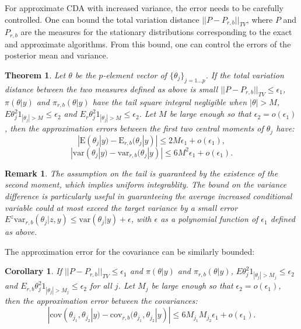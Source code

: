 \documentclass[10pt]{article}
\newtheorem{theorem}{Theorem}
\newtheorem{corollary}{Corollary}
\newtheorem{remark}{Remark}
\begin{document}
For approximate CDA with increased variance, the error needs to be carefully controlled. One can bound the total variation distance $||{P}-{P}_{r,b} ||_{TV}$, where ${P}$ and ${P}_{r,b}$ are the measures for the stationary distributions corresponding to the exact and approximate algorithms. From this bound, one can control the errors of the posterior mean and variance.

\begin{theorem}
Let $\theta$ be the $p$-element vector of $\{\theta_j\}_{j=1\ldots p}$.
If the total variation distance between the two measures defined as above is small $||{P}- {P}_{r,b} ||_{TV}\le \epsilon_1$, $\pi(\theta|y)$ and $\pi_{r,b}(\theta|y)$ have the tail square integral negligible when $|\theta|>M$,  $E \theta_j^2 {1}_{|\theta_j|>M}\le \epsilon_2$ and $E_{r} \theta_j^2 {1}_{|\theta_j|>M}\le \epsilon_2$. Let $M$ be large enough so that $\epsilon_2=o(\epsilon_1)$, then the approximation errors between the first two central moments of $\theta_j$ have:
$$|\mbox{E}(\theta_j|y)-\mbox{E}_{r,b}(\theta_j|y)|\le 2M\epsilon_1+ o(\epsilon_1),$$
$$|\mbox{var}(\theta_j|y)-\mbox{var}_{r,b}(\theta_j|y)|\le 6M^2\epsilon_1+o(\epsilon_1).$$
\end{theorem}
 
 \begin{remark}
 	The assumption on the tail is guaranteed by the existence of the second moment, which implies uniform integrablity. The bound on the variance difference is particularly useful in guaranteeing the average increased conditional variable could at most exceed the target variance by a small error $E^z\mbox{var}_{r,b}(\theta_j|z,y)\le\mbox{var}(\theta_j|y)+\epsilon$, with $\epsilon$ as a polynomial function of $\epsilon_1$ defined as above.
 \end{remark}
 
 The approximation error for the covariance can be similarly bounded:

\begin{corollary}
If $||{P}- {P}_{r,b} ||_{TV}\le \epsilon_1$ and $\pi(\theta|y)$ and $\pi_{r,b}(\theta|y)$, $E \theta_j^2 {1}_{|\theta_j|>M_j}\le \epsilon_2$ and $E_{r,b} \theta_j^2 {1}_{|\theta_j|>M_j}\le \epsilon_2$ for all $j$.  Let $M_j$ be large enough so that $\epsilon_2=o(\epsilon_1)$, then the approximation error between the covariances:
$$|\mbox{cov}(\theta_{j_1},\theta_{j_2}|y)-\mbox{cov}_{r,b}(\theta_{j_1},\theta_{j_2}|y)|\le 6M_{j_1}M_{j_2}\epsilon_1+o(\epsilon_1 ).$$
\end{corollary}
\end{document}
